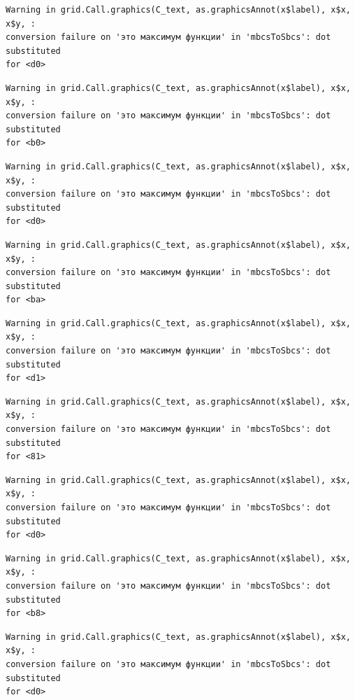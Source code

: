 \documentclass[
  letterpaper,
  DIV=11,
  numbers=noendperiod]{scrreprt}
\theoremstyle{definition}
\theoremstyle{remark}
\begin{document}
\begin{verbatim}
Warning in grid.Call.graphics(C_text, as.graphicsAnnot(x$label), x$x, x$y, :
conversion failure on 'это максимум функции' in 'mbcsToSbcs': dot substituted
for <d0>
\end{verbatim}

\begin{verbatim}
Warning in grid.Call.graphics(C_text, as.graphicsAnnot(x$label), x$x, x$y, :
conversion failure on 'это максимум функции' in 'mbcsToSbcs': dot substituted
for <b0>
\end{verbatim}

\begin{verbatim}
Warning in grid.Call.graphics(C_text, as.graphicsAnnot(x$label), x$x, x$y, :
conversion failure on 'это максимум функции' in 'mbcsToSbcs': dot substituted
for <d0>
\end{verbatim}

\begin{verbatim}
Warning in grid.Call.graphics(C_text, as.graphicsAnnot(x$label), x$x, x$y, :
conversion failure on 'это максимум функции' in 'mbcsToSbcs': dot substituted
for <ba>
\end{verbatim}

\begin{verbatim}
Warning in grid.Call.graphics(C_text, as.graphicsAnnot(x$label), x$x, x$y, :
conversion failure on 'это максимум функции' in 'mbcsToSbcs': dot substituted
for <d1>
\end{verbatim}

\begin{verbatim}
Warning in grid.Call.graphics(C_text, as.graphicsAnnot(x$label), x$x, x$y, :
conversion failure on 'это максимум функции' in 'mbcsToSbcs': dot substituted
for <81>
\end{verbatim}

\begin{verbatim}
Warning in grid.Call.graphics(C_text, as.graphicsAnnot(x$label), x$x, x$y, :
conversion failure on 'это максимум функции' in 'mbcsToSbcs': dot substituted
for <d0>
\end{verbatim}

\begin{verbatim}
Warning in grid.Call.graphics(C_text, as.graphicsAnnot(x$label), x$x, x$y, :
conversion failure on 'это максимум функции' in 'mbcsToSbcs': dot substituted
for <b8>
\end{verbatim}

\begin{verbatim}
Warning in grid.Call.graphics(C_text, as.graphicsAnnot(x$label), x$x, x$y, :
conversion failure on 'это максимум функции' in 'mbcsToSbcs': dot substituted
for <d0>
\end{verbatim}
\end{document}
